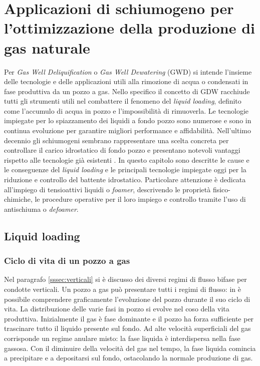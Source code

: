 \clearpage{\pagestyle{empty}\cleardoublepage}
\chapter{Applicazioni di schiumogeno per l'ottimizzazione della produzione di gas naturale}\thispagestyle{empty} 
Per \textit{Gas Well Deliquification} o \textit{Gas Well Dewatering} (GWD) si intende l'insieme delle tecnologie e delle applicazioni utili alla rimozione di acqua o condensati in fase produttiva da un pozzo a gas. Nello specifico il concetto di GDW racchiude tutti gli strumenti utili nel combattere il fenomeno del \textit{liquid loading}, definito come l'accumulo di acqua in pozzo e l'impossibilità di rimuoverla. Le tecnologie impiegate per lo spiazzamento dei liquidi a fondo pozzo sono numerose e sono in continua evoluzione per garantire migliori performance e affidabilità. Nell'ultimo decennio gli schiumogeni sembrano rappresentare una scelta concreta per controllare il carico idrostatico di fondo pozzo e presentano notevoli vantaggi rispetto alle tecnologie già esistenti \parencite{stanculescu2014gwd}. In questo capitolo sono descritte le cause e le conseguenze del \textit{liquid loading} e le principali tecnologie impiegate oggi per la riduzione e controllo del battente idrostatico. Particolare attenzione è dedicata all'impiego di tensioattivi liquidi o \textit{foamer}, descrivendo le proprietà fisico-chimiche, le procedure operative per il loro impiego e controllo tramite l'uso di antischiuma o  \textit{defoamer}.

\section{Liquid loading}
\subsection{Ciclo di vita di un pozzo a gas}
Nel paragrafo \ref{sssec:verticali} si è discusso dei diversi regimi di flusso bifase per condotte verticali. Un pozzo a gas può presentare tutti i regimi di flusso: in  è possibile comprendere graficamente l'evoluzione del pozzo durante il suo ciclo di vita. La distribuzione delle varie fasi in pozzo si evolve nel coso della vita produttiva. Inizialmente il gas è fase dominante e il pozzo ha forza sufficiente per trascinare tutto il liquido presente sul fondo. Ad alte velocità superficiali del gas corrisponde un regime anulare misto: la fase liquida è interdispersa nella fase gassosa. Con il diminuire della velocità del gas nel tempo, la fase liquida comincia a precipitare e a depositarsi sul fondo, ostacolando la normale produzione di gas.

